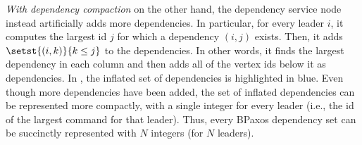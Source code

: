\emph{With dependency compaction} on the other hand, the dependency service
node instead artificially adds more dependencies. In particular, for every
leader $i$, it computes the largest id $j$ for which a dependency $(i, j)$
exists. Then, it adds $\setst{(i, k)}{k \leq j}$ to the dependencies. In other
words, it finds the largest dependency in each column and then adds all of the
vertex ids below it as dependencies. In , the
inflated set of dependencies is highlighted in blue. Even though more
dependencies have been added, the set of inflated dependencies can be
represented more compactly, with a single integer for every leader (i.e., the
id of the largest command for that leader). Thus, every BPaxos dependency set
can be succinctly represented with $N$ integers (for $N$ leaders).

%
%
%
%
